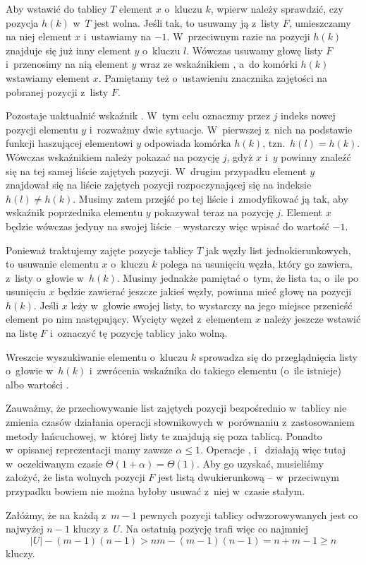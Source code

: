 Aby wstawić do tablicy $T$ element $x$ o~kluczu $k$, wpierw należy sprawdzić, czy pozycja $h(k)$ w~$T$ jest wolna.
Jeśli tak, to usuwamy ją z~listy $F$, umieszczamy na niej element $x$ i~ustawiamy  na $-1$.
W~przeciwnym razie na pozycji $h(k)$ znajduje się już inny element $y$ o~kluczu $l$.
Wówczas usuwamy głowę listy $F$ i~przenosimy na nią element $y$ wraz ze wskaźnikiem , a~do komórki $h(k)$ wstawiamy element $x$.
Pamiętamy też o~ustawieniu znacznika zajętości na pobranej pozycji z~listy $F$.

Pozostaje uaktualnić wskaźnik .
W~tym celu oznaczmy przez $j$ indeks nowej pozycji elementu $y$ i~rozważmy dwie sytuacje.
W~pierwszej z~nich na podstawie funkcji haszującej elementowi $y$ odpowiada komórka $h(k)$, tzn.\ $h(l)=h(k)$.
Wówczas wskaźnikiem  należy pokazać na pozycję $j$, gdyż $x$ i~$y$ powinny znaleźć się na tej samej liście zajętych pozycji.
W~drugim przypadku element $y$ znajdował się na liście zajętych pozycji rozpoczynającej się na indeksie $h(l)\ne h(k)$.
Musimy zatem przejść po tej liście i~zmodyfikować ją tak, aby wskaźnik  poprzednika elementu $y$ pokazywał teraz na pozycję $j$.
Element $x$ będzie wówczas jedyny na swojej liście -- wystarczy więc wpisać do  wartość $-1$.

Ponieważ traktujemy zajęte pozycje tablicy $T$ jak węzły list jednokierunkowych, to usuwanie elementu $x$ o~kluczu $k$ polega na usunięciu węzła, który go zawiera, z~listy o~głowie w~$h(k)$.
Musimy jednakże pamiętać o~tym, że lista ta, o~ile po usunięciu $x$ będzie zawierać jeszcze jakieś węzły, powinna mieć głowę na pozycji $h(k)$.
Jeśli $x$ leży w~głowie swojej listy, to wystarczy na jego miejsce przenieść element po nim następujący.
Wycięty węzeł z~elementem $x$ należy jeszcze wstawić na listę $F$ i~oznaczyć tę pozycję tablicy jako wolną.

Wreszcie wyszukiwanie elementu o~kluczu $k$ sprowadza się do przeglądnięcia listy o~głowie w~$h(k)$ i~zwrócenia wskaźnika do takiego elementu (o~ile istnieje) albo wartości .

Zauważmy, że przechowywanie list zajętych pozycji bezpośrednio w~tablicy nie zmienia czasów działania operacji słownikowych w~porównaniu z~zastosowaniem metody łańcuchowej, w~której listy te znajdują się poza tablicą.
Ponadto w~opisanej reprezentacji mamy zawsze $\alpha\le1$.
Operacje ,  i~ działają więc tutaj w~oczekiwanym czasie $\Theta(1+\alpha)=\Theta(1)$.
Aby go uzyskać, musieliśmy założyć, że lista wolnych pozycji $F$ jest listą dwukierunkową -- w~przeciwnym przypadku bowiem nie można byłoby usuwać z~niej w~czasie stałym.

\exercise %
Załóżmy, że na każdą z~$m-1$ pewnych pozycji tablicy odwzorowywanych jest co najwyżej $n-1$ kluczy z~$U$.
Na ostatnią pozycję trafi więc co najmniej
\[
	|U|-(m-1)(n-1) > nm-(m-1)(n-1) = n+m-1 \ge n
\]
kluczy.

